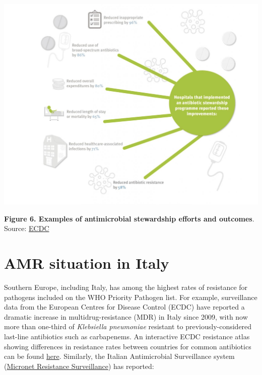 \documentclass[
]{book}
\begin{document}
\includegraphics[width=8.33333in,height=\textheight]{images/stewardship_impl.png}

\textbf{Figure 6. Examples of antimicrobial stewardship efforts and outcomes}. Source: \href{https://antibiotic.ecdc.europa.eu/en/infographics-about-antibiotic-stewardship-programmes}{ECDC}

\hypertarget{amr-situation-in-italy}{%
\section*{AMR situation in Italy}\label{amr-situation-in-italy}}

Southern Europe, including Italy, has among the highest rates of resistance for pathogens included on the WHO Priority Pathogen list. For example, surveillance data from the European Centres for Disease Control (ECDC) have reported a dramatic increase in multidrug-resistance (MDR) in Italy since 2009, with now more than one-third of \emph{Klebsiella pneumoniae} resistant to previously-considered last-line antibiotics such as carbapenems. An interactive ECDC resistance atlas showing differences in resistance rates between countries for common antibiotics can be found \href{https://atlas.ecdc.europa.eu/public/index.aspx?Dataset=27\&HealthTopic=4}{here}. Similarly, the Italian Antimicrobial Surveillance system (\href{https://www.epicentro.iss.it/antibiotico-resistenza/epidemiologia-italia}{Micronet Resistance Surveillance}) has reported:
\end{document}
